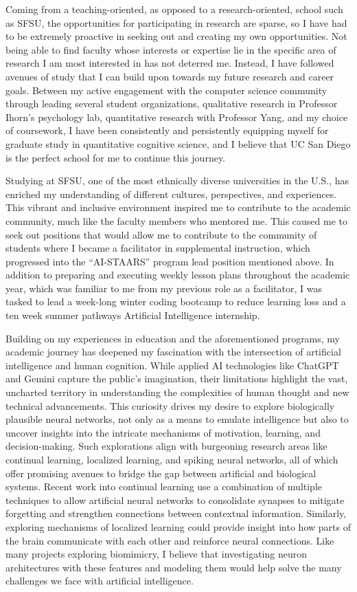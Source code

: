 \documentclass[12pt]{article}
\begin{document}
Coming from a teaching-oriented, as opposed to a research-oriented, school such as SFSU, the opportunities for participating in research
are sparse, so I have had to be extremely proactive in seeking out and creating my own opportunities. Not being able to find faculty whose
interests or expertise lie in the specific area of research I am most interested in has not deterred me. Instead, I have followed avenues
of study that I can build upon towards my future research and career goals. Between my active engagement with the computer science
community through leading several student organizations, qualitative research in Professor Ihorn's psychology lab, quantitative research
with Professor Yang, and my choice of coursework, I have been consistently and persistently equipping myself for graduate study in
quantitative cognitive science, and I believe that UC San Diego is the perfect school for me to continue this journey.

Studying at SFSU, one of the most ethnically diverse universities in the U.S., has enriched my understanding of different cultures,
perspectives, and experiences. This vibrant and inclusive environment inspired me to contribute to the academic community, much like the
faculty members who mentored me. This caused me to seek out positions that would allow me to contribute to the community of students where
I became a facilitator in supplemental instruction, which progressed into the ``AI-STAARS'' program lead position mentioned above.  In
addition to preparing and executing weekly lesson plans throughout the academic year, which was familiar to me from my previous role as a
facilitator, I was tasked to lead a week-long winter coding bootcamp to reduce learning loss and a ten week summer pathways Artificial
Intelligence internship.

Building on my experiences in education and the aforementioned programs, my academic journey has deepened my fascination with the
intersection of artificial intelligence and human cognition. While applied AI technologies like ChatGPT and Gemini capture the public's
imagination, their limitations highlight the vast, uncharted territory in understanding the complexities of human thought and new technical
advancements. This curiosity drives my desire to explore biologically plausible neural networks, not only as a means to emulate intelligence
but also to uncover insights into the intricate mechanisms of motivation, learning, and decision-making. Such explorations align with
burgeoning research areas like continual learning, localized learning, and spiking neural networks, all of which offer promising avenues to
bridge the gap between artificial and biological systems.  Recent work into continual learning use a combination of multiple techniques to
allow artificial neural networks to consolidate synapses to mitigate forgetting and strengthen connections between contextual information.
Similarly, exploring mechanisms of localized learning could provide insight into how parts of the brain communicate with each other and
reinforce neural connections. Like many projects exploring biomimicry, I believe that investigating neuron architectures with these features
and modeling them would help solve the many challenges we face with artificial intelligence.
\end{document}
